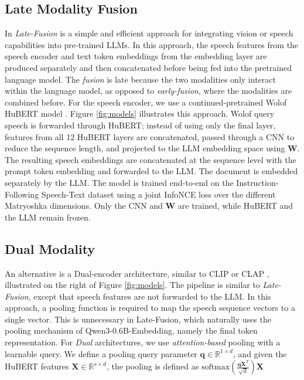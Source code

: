 \documentclass[11pt]{article}
\begin{document}
\subsection{Late Modality Fusion}
In \textit{Late-Fusion} \cite{llava, llamaspeech} is a simple and efficient approach for integrating vision or speech capabilities into pre-trained LLMs. In this approach, the speech features from the speech encoder and text token embeddings from the embedding layer are produced separately and then concatenated before being fed into the pretrained language model. The \textit{fusion} is late because the two modalities only interact within the language model, as opposed to \textit{early-fusion}, where the modalities are combined before. For the speech encoder, we use a continued-pretrained Wolof HuBERT model \citep{sy2025speechlanguagemodelsunderrepresented}. Figure \ref{fig:models} illustrates this approach. Wolof query speech is forwarded through HuBERT; instead of using only the final layer, features from all 12 HuBERT layers are concatenated, passed through a CNN to reduce the sequence length, and projected to the LLM embedding space using $\mathbf{W}$. The resulting speech embeddings are concatenated at the sequence level with the prompt token embedding and forwarded to the LLM. The document is embedded separately by the LLM. The model is trained end-to-end on the Instruction-Following Speech-Text dataset using a joint InfoNCE loss over the different Matryoshka dimensions. Only the CNN and $\mathbf{W}$ are trained, while HuBERT and the LLM remain frozen.

\subsection{Dual Modality}
An alternative is a Dual-encoder architecture, similar to CLIP \citep{clip} or CLAP \citep{clap}, illustrated on the right of Figure \ref{fig:models}. The pipeline is similar to \textit{Late-Fusion}, except that speech features are not forwarded to the LLM. In this approach, a pooling function is required to map the speech sequence vectors to a single vector. This is unnecessary in Late-Fusion, which naturally uses the pooling mechanism of Qwen3-0.6B-Embedding, namely the final token representation. For \textit{Dual} architectures, we use \textit{attention-based} pooling with a learnable query. We define a pooling query parameter $\textbf{q} \in \mathbb{R}^{1\times d}$, and given the HuBERT features $\textbf{X} \in \mathbb{R}^{s\times d}$, the pooling is defined as $\text {softmax}(\frac{\textbf{q} \textbf{X}^{T}}{\sqrt{d}}) \textbf{X}$
\end{document}
